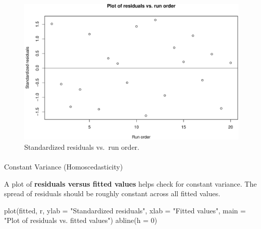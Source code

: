 \documentclass[
  letterpaper,
]{scrbook}
\makeatletter
\let\oldparagraph\paragraph
\renewcommand{\paragraph}{
    \@ifstar
      \xxxParagraphStar
      \xxxParagraphNoStar
  }
\newcommand{\xxxParagraphStar}[1]{\oldparagraph*{#1}\mbox{}}
\newcommand{\xxxParagraphNoStar}[1]{\oldparagraph{#1}\mbox{}}
\newenvironment{Shaded}{\begin{snugshade}}{\end{snugshade}}
\newcommand{\AttributeTok}[1]{\textcolor[rgb]{0.40,0.45,0.13}{#1}}
\newcommand{\DecValTok}[1]{\textcolor[rgb]{0.68,0.00,0.00}{#1}}
\newcommand{\FunctionTok}[1]{\textcolor[rgb]{0.28,0.35,0.67}{#1}}
\newcommand{\NormalTok}[1]{\textcolor[rgb]{0.00,0.23,0.31}{#1}}
\newcommand{\StringTok}[1]{\textcolor[rgb]{0.13,0.47,0.30}{#1}}
\makeatother
\begin{document}
\begin{figure}[H]

{\centering \includegraphics{unit5-factor/crbd_files/figure-pdf/residuals-vs-order-1.pdf}

}

\caption{Standardized residuals vs.~run order.}

\end{figure}%

\paragraph{Constant Variance
(Homoscedasticity)}\label{constant-variance-homoscedasticity}

A plot of \textbf{residuals versus fitted values} helps check for
constant variance. The spread of residuals should be roughly constant
across all fitted values.

\begin{Shaded}
\begin{Highlighting}[]
\FunctionTok{plot}\NormalTok{(fitted, r, }\AttributeTok{ylab =} \StringTok{"Standardized residuals"}\NormalTok{, }
     \AttributeTok{xlab =} \StringTok{"Fitted values"}\NormalTok{, }\AttributeTok{main =} \StringTok{"Plot of residuals vs. fitted values"}\NormalTok{)}
\FunctionTok{abline}\NormalTok{(}\AttributeTok{h =} \DecValTok{0}\NormalTok{)}
\end{Highlighting}
\end{Shaded}
\end{document}
